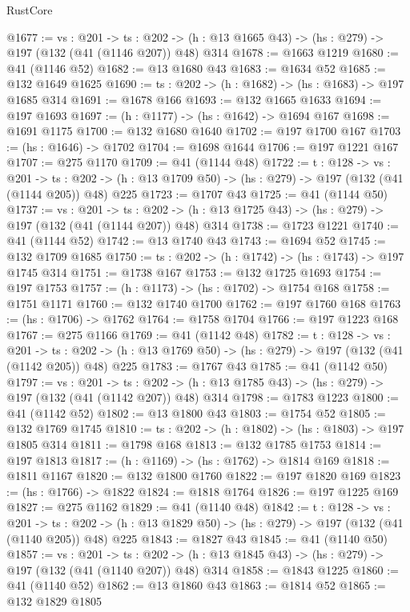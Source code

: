 \begin{lexlean}{RustCore}
\begin{coremodule}
@1677 := {vs : @201} ->
  {ts : @202} -> (h : @13 @1665 @43) -> (hs : @279) -> @197 (@132 (@41 (@1146 @207)) @48) @314
@1678 := @1663 @1219
@1680 := @41 (@1146 @52)
@1682 := @13 @1680 @43
@1683 := @1634 @52
@1685 := @132 @1649 @1625
@1690 := {ts : @202} -> (h : @1682) -> (hs : @1683) -> @197 @1685 @314
@1691 := @1678 @166
@1693 := @132 @1665 @1633
@1694 := @197 @1693
@1697 := (h : @1177) -> (hs : @1642) -> @1694 @167
@1698 := @1691 @1175
@1700 := @132 @1680 @1640
@1702 := @197 @1700 @167
@1703 := (hs : @1646) -> @1702
@1704 := @1698 @1644
@1706 := @197 @1221 @167
@1707 := @275 @1170
@1709 := @41 (@1144 @48)
@1722 := {t : @128} ->
  {vs : @201} ->
  {ts : @202} -> (h : @13 @1709 @50) -> (hs : @279) -> @197 (@132 (@41 (@1144 @205)) @48) @225
@1723 := @1707 @43
@1725 := @41 (@1144 @50)
@1737 := {vs : @201} ->
  {ts : @202} -> (h : @13 @1725 @43) -> (hs : @279) -> @197 (@132 (@41 (@1144 @207)) @48) @314
@1738 := @1723 @1221
@1740 := @41 (@1144 @52)
@1742 := @13 @1740 @43
@1743 := @1694 @52
@1745 := @132 @1709 @1685
@1750 := {ts : @202} -> (h : @1742) -> (hs : @1743) -> @197 @1745 @314
@1751 := @1738 @167
@1753 := @132 @1725 @1693
@1754 := @197 @1753
@1757 := (h : @1173) -> (hs : @1702) -> @1754 @168
@1758 := @1751 @1171
@1760 := @132 @1740 @1700
@1762 := @197 @1760 @168
@1763 := (hs : @1706) -> @1762
@1764 := @1758 @1704
@1766 := @197 @1223 @168
@1767 := @275 @1166
@1769 := @41 (@1142 @48)
@1782 := {t : @128} ->
  {vs : @201} ->
  {ts : @202} -> (h : @13 @1769 @50) -> (hs : @279) -> @197 (@132 (@41 (@1142 @205)) @48) @225
@1783 := @1767 @43
@1785 := @41 (@1142 @50)
@1797 := {vs : @201} ->
  {ts : @202} -> (h : @13 @1785 @43) -> (hs : @279) -> @197 (@132 (@41 (@1142 @207)) @48) @314
@1798 := @1783 @1223
@1800 := @41 (@1142 @52)
@1802 := @13 @1800 @43
@1803 := @1754 @52
@1805 := @132 @1769 @1745
@1810 := {ts : @202} -> (h : @1802) -> (hs : @1803) -> @197 @1805 @314
@1811 := @1798 @168
@1813 := @132 @1785 @1753
@1814 := @197 @1813
@1817 := (h : @1169) -> (hs : @1762) -> @1814 @169
@1818 := @1811 @1167
@1820 := @132 @1800 @1760
@1822 := @197 @1820 @169
@1823 := (hs : @1766) -> @1822
@1824 := @1818 @1764
@1826 := @197 @1225 @169
@1827 := @275 @1162
@1829 := @41 (@1140 @48)
@1842 := {t : @128} ->
  {vs : @201} ->
  {ts : @202} -> (h : @13 @1829 @50) -> (hs : @279) -> @197 (@132 (@41 (@1140 @205)) @48) @225
@1843 := @1827 @43
@1845 := @41 (@1140 @50)
@1857 := {vs : @201} ->
  {ts : @202} -> (h : @13 @1845 @43) -> (hs : @279) -> @197 (@132 (@41 (@1140 @207)) @48) @314
@1858 := @1843 @1225
@1860 := @41 (@1140 @52)
@1862 := @13 @1860 @43
@1863 := @1814 @52
@1865 := @132 @1829 @1805

\end{coremodule}
\end{lexlean}
